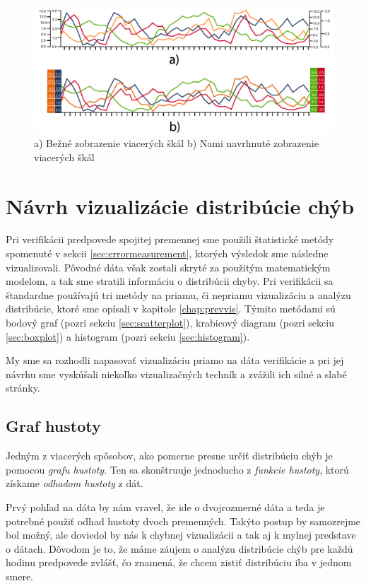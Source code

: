 \begin{figure}
	\centering
	\includegraphics[width = 5in]{multilinegraph}
	\caption{a) Bežné zobrazenie viacerých škál b) Nami navrhnuté zobrazenie viacerých škál }
	\label{fig:multilinegraph} 
\end{figure}

\section{Návrh vizualizácie distribúcie chýb}
Pri verifikácii predpovede spojitej premennej sme použili štatistické metódy spomenuté v sekcii \ref{sec:errormeasurement}, ktorých výsledok sme následne vizualizovali. Pôvodné dáta však zostali skryté za použitým matematickým modelom, a tak sme stratili informáciu o distribúcii chyby. Pri verifikácii sa štandardne používajú tri metódy na priamu, či nepriamu vizualizáciu a analýzu distribúcie, ktoré sme opísali v kapitole \ref{chap:prevvis}. Týmito metódami sú bodový graf (pozri sekciu \ref{sec:scatterplot}), krabicový diagram (pozri sekciu \ref{sec:boxplot}) a histogram (pozri sekciu \ref{sec:histogram}).

My sme sa rozhodli napasovať vizualizáciu priamo na dáta verifikácie a pri jej návrhu sme vyskúšali niekoľko vizualizačných techník a zvážili ich silné a slabé stránky. 

\subsection{Graf hustoty} %

Jedným z viacerých spôsobov, ako pomerne presne určiť distribúciu chýb je pomocou \textit{grafu hustoty}. Ten sa skonštruuje jednoducho z \textit{funkcie hustoty}, ktorú získame \textit{odhadom hustoty} z dát. 

Prvý pohľad na dáta by nám vravel, že ide o dvojrozmerné dáta a teda je potrebné použiť odhad hustoty dvoch premenných. Takýto postup by samozrejme bol možný, ale doviedol by nás k chybnej vizualizácii a tak aj k mylnej predstave o dátach. Dôvodom je to, že máme záujem o analýzu distribúcie chýb pre každú hodinu predpovede zvlášť, čo znamená, že chcem zistiť distribúciu iba v jednom smere.

